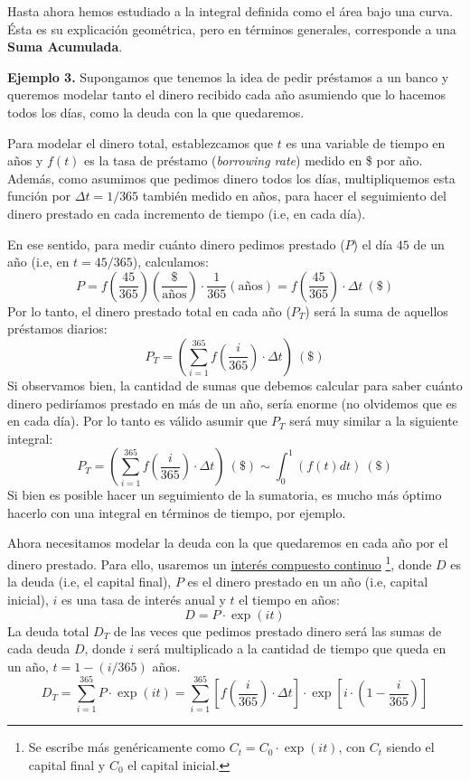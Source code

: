 \documentclass[12pt]{article}
\begin{document}
Hasta ahora hemos estudiado a la integral definida como el área bajo una curva. Ésta es su explicación geométrica, pero en términos generales, corresponde a una \textbf{Suma Acumulada}.

\textbf{Ejemplo 3.} \quad Supongamos que tenemos la idea de pedir préstamos a un banco y queremos modelar tanto el dinero recibido cada año asumiendo que lo hacemos todos los días, como la deuda con la que quedaremos.

Para modelar el dinero total, establezcamos que $t$ es una variable de tiempo en años y $f(t)$ es la tasa de préstamo (\textit{borrowing rate}) medido en \$ por año. Además, como asumimos que pedimos dinero todos los días, multipliquemos esta función por $\Delta t = 1/365$ también medido en años, para hacer el seguimiento del dinero prestado en cada incremento de tiempo (i.e, en cada día).

En ese sentido, para medir cuánto dinero pedimos prestado ($P$) el día $45$ de un año (i.e, en $t = 45/365$), calculamos:
\[
  P = f\left(\frac{45}{365}\right) \left(\frac{\$}{\text{años}}\right) \cdot \frac{1}{365} (\text{años})
    = f\left(\frac{45}{365}\right) \cdot \Delta t \ (\$)
\]
Por lo tanto, el dinero prestado total en cada año ($P_{T}$) será la suma de aquellos préstamos diarios:
\[
  P_{T} = \left(\sum_{i = 1}^{365} f\left(\frac{i}{365}\right) \cdot \Delta t \right) \ (\$)
\]
Si observamos bien, la cantidad de sumas que debemos calcular para saber cuánto dinero pediríamos prestado en más de un año, sería enorme (no olvidemos que es en cada día). Por lo tanto es válido asumir que $P_{T}$ será muy similar a la siguiente integral:
\[
  P_{T} = \left(\sum_{i = 1}^{365} f\left(\frac{i}{365}\right) \cdot \Delta t\right) \ (\$)
         \sim \int_{0}^{1} (f(t) dt) \ (\$)
\]
Si bien es posible hacer un seguimiento de la sumatoria, es mucho más óptimo hacerlo con una integral en términos de tiempo, por ejemplo.

Ahora necesitamos modelar la deuda con la que quedaremos en cada año por el dinero prestado. Para ello, usaremos un \href{https://en.wikipedia.org/wiki/Compound_interest#Continuous_compounding}{interés compuesto continuo} \footnote{Se escribe más genéricamente como $C_{t} = C_{0} \cdot \exp(it)$, con $C_{t}$ siendo el capital final y $C_{0}$ el capital inicial.}, donde $D$ es la deuda (i.e, el capital final), $P$ es el dinero prestado en un año (i.e, capital inicial), $i$ es una tasa de interés anual y $t$ el tiempo en años:
\[
  D = P \cdot \exp(it)
\]
La deuda total $D_{T}$ de las veces que pedimos prestado dinero será las sumas de cada deuda $D$, donde $i$ será multiplicado a la cantidad de tiempo que queda en un año, $t = 1 - (i/365)$ años.
\[
D_{T} = \sum_{i = 1}^{365} P \cdot \exp(it)
      = \sum_{i = 1}^{365} \left[f\left(\frac{i}{365}\right) \cdot \Delta t \right] \cdot
        \exp\left[i \cdot \left(1 - \frac{i}{365}\right)\right]
\]
\end{document}
